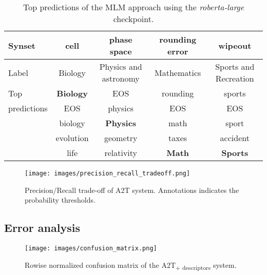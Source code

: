 \documentclass[11pt]{article}
\begin{document}
\begin{table*}[!ht]
    \centering
\begin{tabularx}{0.9\linewidth}{l|cccc}
        \toprule
        Synset & cell & phase space & rounding error & wipeout\\
        \midrule
        Label & Biology & Physics and astronomy & Mathematics & Sports and Recreation \\
        \midrule
        Top         & \textbf{Biology}   & EOS           & rounding  & sports \\
        predictions & EOS       & physics       & EOS       & EOS \\
                    & biology   & \textbf{Physics}       & math      & sport \\
                    & evolution & geometry      & taxes     & accident \\
                    & life      & relativity    & \textbf{Math}      & \textbf{Sports}\\
        \bottomrule
    \end{tabularx}
\caption{Top predictions of the MLM approach using the \textit{roberta-large} checkpoint.}
    \label{tab:mlm_examples}
\end{table*}



\begin{figure}[!ht]
    \centering
    \texttt{[image: images/precision\_recall\_tradeoff.png]}
    \caption{Precision/Recall trade-off of A2T system. Annotations indicates the probability thresholds.}
    \label{fig:precision-recall_tradeoff}
\end{figure}

\subsection{Error analysis}

\begin{figure}
    \centering
    \texttt{[image: images/confusion\_matrix.png]}
    \caption{Rowise normalized confusion matrix of the A2T\textsubscript{+ descriptors} system.}
    \label{fig:confusion_matrix}
\end{figure}
\end{document}
